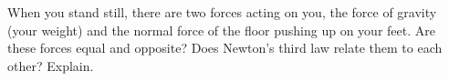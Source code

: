 When you stand still, there are two forces acting on you,
        the force of gravity (your weight) and the normal force of
        the floor pushing up on your feet. Are these forces equal
        and opposite? Does Newton's third law relate them to each
        other? Explain.
